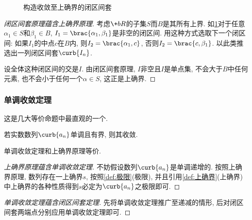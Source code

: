 \documentclass[hidelinks]{ctexart}
\begin{document}
\begin{figure}[h]
    \centering
    \caption{构造收敛至上确界的闭区间套}
    \label{fig:构造收敛至上确界的闭区间套}
\end{figure}
\begin{proof}[闭区间套原理蕴含上确界原理]
    考虑$\+bR$的子集$S$而$B$是其所有上界. 如\cref{fig:构造收敛至上确界的闭区间套}对于任意$\alpha_1\in S$和$\beta_1\in B$, $I_1=\brac{\alpha_1, \beta_1}$是非空的闭区间. 用这种方式选取下一个闭区间:  如果$I_1$的中点$c$在$B$内, 则$I_2=\brac{\alpha_1,c}$, 否则$I_2=\brac{c,\beta_1}$. 以此类推选出一列闭区间套$\curb{I_n}$.
    \par
    设全体这种闭区间的交是$I$. 由闭区间套原理, $I$非空且$I$是单点集, 不会大于$B$中任何元素, 也不会小于任何一个$\alpha\in S$, 这正是上确界.
\end{proof}


\subsubsection{单调收敛定理} %
\label{ssub:单调收敛定理}

这是几大等价命题中最直观的一个.
\begin{finale}
    \begin{theorem}[单调收敛定理]
        若实数数列$\curb{a_n}$单调且有界, 则其收敛.
    \end{theorem}
    \begin{theorem}[等价性]
        单调收敛定理和上确界原理等价.
    \end{theorem}
\end{finale}
\begin{proof}[上确界原理蕴含单调收敛定理]
    不妨假设数列$\curb{a_n}$是单调递增的. 按照上确界原理, 数列存在一上确界$s$, 按照\cref{def:极限}(极限), 并且引用\cref{def:上确界}(上确界)中上确界的各种性质得到$s$必定为$\curb{a_n}$之极限即可.
\end{proof}
\begin{proof}[单调收敛定理蕴含闭区间套定理]
    先将单调收敛定理推广至递减的情形, 后对闭区间套两端点分别应用单调收敛定理即可. 
\end{proof}
\end{document}
